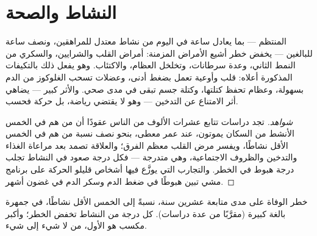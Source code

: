 \section{النشاط والصحة}

\begin{proposition}\label{prop:g10:sport-and-health:health}
 المنتظم --- بما يعادل ساعة في اليوم من نشاط معتدل
للمراهقين، ونصف ساعة للبالغين --- يخفض خطر أشيع الأمراض المزمنة: أمراض
القلب والشرايين، والسكري من النمط الثاني، وعدة سرطانات، وتخلخل العظام،
والاكتئاب. وهو يفعل ذلك بالتكيفات المذكورة أعلاه: قلب وأوعية تعمل
بضغط أدنى، وعضلات تسحب الغلوكوز من الدم بسهولة، وعظام تحفظ كتلتها،
وكتلة جسم تبقى في مدى صحي. والأثر كبير --- يضاهي أثر الامتناع عن
التدخين --- وهو لا يقتضي رياضة، بل حركة فحسب.
\end{proposition}
\begin{proof}[شواهد]
تجد دراسات تتابع عشرات الألوف من الناس عقودًا أن من هم في الخمس الأنشط
من السكان يموتون، عند عمر معطى، بنحو نصف نسبة من هم في الخمس الأقل
نشاطًا، ويفسر مرض القلب معظم الفرق؛ والعلاقة تصمد بعد مراعاة الغذاء
والتدخين والظروف الاجتماعية، وهي متدرجة --- فكل درجة صعود في النشاط
تجلب درجة هبوط في الخطر. والتجارب التي يوزَّع فيها أشخاص قليلو الحركة
على برنامج مشي تبين هبوطًا في ضغط الدم وسكر الدم في غضون أشهر.
\end{proof}

\begin{omfigure}

{\small خطر الوفاة على مدى متابعة عشرين سنة، نسبةً إلى الخمس الأقل
نشاطًا، في جمهرة بالغة كبيرة (مقرَّبًا من عدة دراسات). كل درجة من
النشاط تخفض الخطر؛ وأكبر مكسب هو الأول، من لا شيء إلى شيء.}
\end{omfigure}

